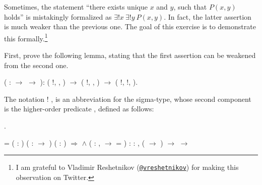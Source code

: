 \begin{exercise}


Sometimes, the statement ``there exists unique $x$ and $y$, such that
$P(x, y)$ holds'' is mistakingly formalized as $\exists ! x~\exists !
y~P(x, y)$. In fact, the latter assertion is much weaker than the
previous one. The goal of this exercise is to demonstrate this
formally.\footnote{I am grateful to Vladimir Reshetnikov
(\href{https://twitter.com/vreshetnikov}{\texttt{@vreshetnikov}}) for
making this observation on Twitter.}


First, prove the following lemma, stating that the first assertion can
be weakened from the second one.


\begin{coqdoccode}
\coqdocemptyline
\coqdocnoindent
{}   ( :  \ensuremath{\rightarrow}  \ensuremath{\rightarrow} ): \coqdoceol
\coqdocindent{1.00em}
(\coqdoctac{\ensuremath{\exists}} !, \coqdoctac{\ensuremath{\exists}} ,   ) \ensuremath{\rightarrow} \coqdoceol
\coqdocindent{1.00em}
(\coqdoctac{\ensuremath{\exists}} !, \coqdoctac{\ensuremath{\exists}} ,   ) \ensuremath{\rightarrow}\coqdoceol
\coqdocindent{1.00em}
(\coqdoctac{\ensuremath{\exists}} !, \coqdoctac{\ensuremath{\exists}} !,   ).\coqdoceol
\coqdocemptyline
\end{coqdoccode}


The notation \coqdoctac{\ensuremath{\exists}} ! ,   is an abbreviation for the sigma-type,
whose second component is the higher-order predicate , defined
as follows:


\begin{coqdoccode}
\coqdocemptyline
\coqdocnoindent
{} .\coqdoceol
\coqdocemptyline
\end{coqdoccode}
\coqdoceol
\coqdocemptyline
\coqdocnoindent
{} = \coqdoceol
\coqdocnoindent
{} ( : ) ( :  \ensuremath{\rightarrow} ) ( : ) \ensuremath{\Rightarrow}\coqdoceol
\coqdocnoindent
{}  \ensuremath{\land} (\coqdockw{\ensuremath{\forall}}  : ,   \ensuremath{\rightarrow}  = )\coqdoceol
\coqdocindent{2.50em}
: \coqdockw{\ensuremath{\forall}}  : , ( \ensuremath{\rightarrow} ) \ensuremath{\rightarrow}  \ensuremath{\rightarrow} 


\end{exercise}
